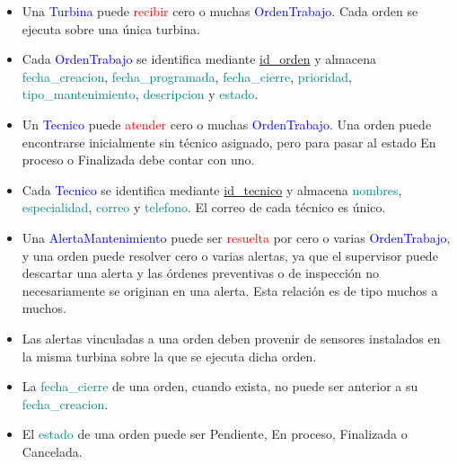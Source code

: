 \documentclass[11pt,a4paper]{article}
\begin{document}
\begin{itemize}
    \item Una \textcolor{blue}{Turbina} puede \textcolor{red}{recibir} cero o muchas
    \textcolor{blue}{OrdenTrabajo}. Cada orden se ejecuta sobre una única turbina.
    \par\bigskip

    \item Cada \textcolor{blue}{OrdenTrabajo} se identifica mediante
    \underline{id\_orden} y almacena \textcolor{teal}{fecha\_creacion},
    \textcolor{teal}{fecha\_programada}, \textcolor{teal}{fecha\_cierre},
    \textcolor{teal}{prioridad}, \textcolor{teal}{tipo\_mantenimiento},
    \textcolor{teal}{descripcion} y \textcolor{teal}{estado}.
    \par\bigskip

    \item Un \textcolor{blue}{Tecnico} puede \textcolor{red}{atender} cero o muchas
    \textcolor{blue}{OrdenTrabajo}. Una orden puede encontrarse inicialmente sin
    técnico asignado, pero para pasar al estado En proceso o Finalizada debe contar
    con uno.
    \par\bigskip

    \item Cada \textcolor{blue}{Tecnico} se identifica mediante
    \underline{id\_tecnico} y almacena \textcolor{teal}{nombres},
    \textcolor{teal}{especialidad}, \textcolor{teal}{correo} y
    \textcolor{teal}{telefono}. El correo de cada técnico es único.
    \par\bigskip

    \item Una \textcolor{blue}{AlertaMantenimiento} puede ser
    \textcolor{red}{resuelta} por cero o varias \textcolor{blue}{OrdenTrabajo}, y una
    orden puede resolver cero o varias alertas, ya que el supervisor puede descartar
    una alerta y las órdenes preventivas o de inspección no necesariamente se originan
    en una alerta. Esta relación es de tipo muchos a muchos.
    \par\bigskip

    \item Las alertas vinculadas a una orden deben provenir de sensores instalados en
    la misma turbina sobre la que se ejecuta dicha orden.
    \par\bigskip

    \item La \textcolor{teal}{fecha\_cierre} de una orden, cuando exista, no puede ser
    anterior a su \textcolor{teal}{fecha\_creacion}.
    \par\bigskip

    \item El \textcolor{teal}{estado} de una orden puede ser Pendiente, En proceso,
    Finalizada o Cancelada.
\end{itemize}
\end{document}
